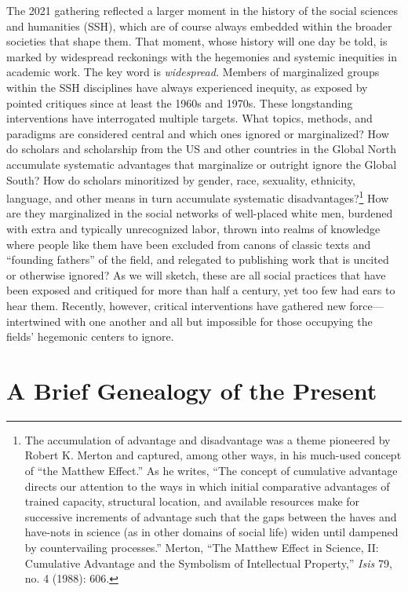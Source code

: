 \documentclass{tufte-handout}
\begin{document}
The 2021 gathering reflected a larger moment in the history of the
social sciences and humanities (SSH), which are of course always
embedded within the broader societies that shape them. That moment,
whose history will one day be told, is marked by widespread reckonings
with the hegemonies and systemic inequities in academic work. The key
word is \emph{widespread.} Members of marginalized groups within the SSH
disciplines have always experienced inequity, as exposed by pointed
critiques since at least the 1960s and 1970s. These longstanding
interventions have interrogated multiple targets. What topics, methods,
and paradigms are considered central and which ones ignored or
marginalized? How do scholars and scholarship from the US and other
countries in the Global North accumulate systematic advantages that
marginalize or outright ignore the Global South? How do scholars
minoritized by gender, race, sexuality, ethnicity, language, and other
means in turn accumulate systematic disadvantages?\footnote{The
  accumulation of advantage and disadvantage was a theme pioneered by
  Robert K. Merton and captured, among other ways, in his much-used
  concept of ``the Matthew Effect.'' As he writes, ``The concept of
  cumulative advantage directs our attention to the ways in which
  initial comparative advantages of trained capacity, structural
  location, and available resources make for successive increments of
  advantage such that the gaps between the haves and have-nots in
  science (as in other domains of social life) widen until dampened by
  countervailing processes.'' Merton, ``The Matthew Effect in Science,
  II: Cumulative Advantage and the Symbolism of Intellectual Property,''
  \emph{Isis} 79, no. 4 (1988): 606.} How are they marginalized in the
social networks of well-placed white men, burdened with extra and
typically unrecognized labor, thrown into realms of knowledge where
people like them have been excluded from canons of classic texts and
``founding fathers'' of the field, and relegated to publishing work that
is uncited or otherwise ignored? As we will sketch, these are all social
practices that have been exposed and critiqued for more than half a
century, yet too few had ears to hear them. Recently, however, critical
interventions have gathered new force---intertwined with one another and
all but impossible for those occupying the fields' hegemonic centers to
ignore.

\hypertarget{a-brief-genealogy-of-the-present}{%
\section{A Brief Genealogy of the
Present}\label{a-brief-genealogy-of-the-present}}
\end{document}
